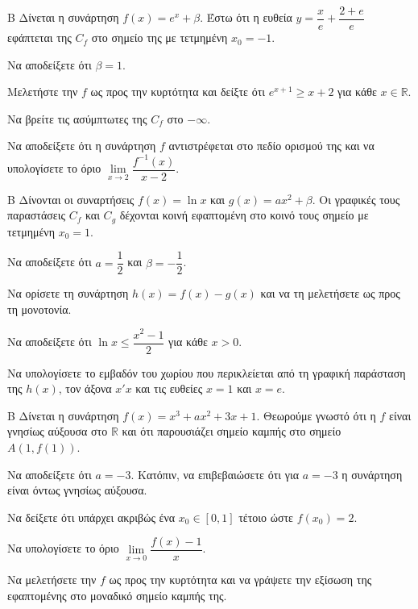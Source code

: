 \begin{thema}{Β}
Δίνεται η συνάρτηση $f(x) = e^x + \beta$. Έστω ότι η ευθεία $y = \dfrac{x}{e}+\dfrac{2+e}{e}$ εφάπτεται της $C_f$ στο σημείο της με τετμημένη $x_0=-1$.
\begin{erwthma}
  \item Να αποδείξετε ότι $\beta=1$.
  \item Μελετήστε την $f$ ως προς την κυρτότητα και δείξτε ότι $e^{x+1}\geq x+2$ για κάθε $x\in\mathbb{R}$.
  \item Να βρείτε τις ασύμπτωτες της $C_f$ στο $-\infty$.
  \item Να αποδείξετε ότι η συνάρτηση $f$ αντιστρέφεται στο πεδίο ορισμού της και να υπολογίσετε το όριο $\lim\limits_{x \to 2} \dfrac{f^{-1}(x)}{x-2}$.
\end{erwthma}
\end{thema}

\begin{thema}{Β}
Δίνονται οι συναρτήσεις $f(x) = \ln x$ και $g(x) = a x^2 + \beta$. Οι γραφικές τους παραστάσεις $C_f$ και $C_g$ δέχονται κοινή εφαπτομένη στο κοινό τους σημείο με τετμημένη $x_0=1$.
\begin{erwthma}
  \item Να αποδείξετε ότι $a=\dfrac{1}{2}$ και $\beta=-\dfrac{1}{2}$.
  \item Να ορίσετε τη συνάρτηση $h(x) = f(x) - g(x)$ και να τη μελετήσετε ως προς τη μονοτονία.
  \item Να αποδείξετε ότι $\ln x \le \dfrac{x^2-1}{2}$ για κάθε $x > 0$.
  \item Να υπολογίσετε το εμβαδόν του χωρίου που περικλείεται από τη γραφική παράσταση της $h(x)$, τον άξονα $x'x$ και τις ευθείες $x=1$ και $x=e$.
\end{erwthma}
\end{thema}

\begin{thema}{Β}
Δίνεται η συνάρτηση $f(x) = x^3 + a x^2 + 3x + 1$. Θεωρούμε γνωστό ότι η $f$ είναι γνησίως αύξουσα στο $\mathbb{R}$ και ότι παρουσιάζει σημείο καμπής στο σημείο $A(1, f(1))$.
\begin{erwthma}
  \item Να αποδείξετε ότι $a=-3$. Κατόπιν, να επιβεβαιώσετε ότι για $a=-3$ η συνάρτηση είναι όντως γνησίως αύξουσα.
  \item Να δείξετε ότι υπάρχει ακριβώς ένα $x_0 \in [0, 1]$ τέτοιο ώστε $f(x_0)=2$.
  \item Να υπολογίσετε το όριο $\lim\limits_{x \to 0} \dfrac{f(x)-1}{x}$.
  \item Να μελετήσετε την $f$ ως προς την κυρτότητα και να γράψετε την εξίσωση της εφαπτομένης στο μοναδικό σημείο καμπής της.
\end{erwthma}
\end{thema}

